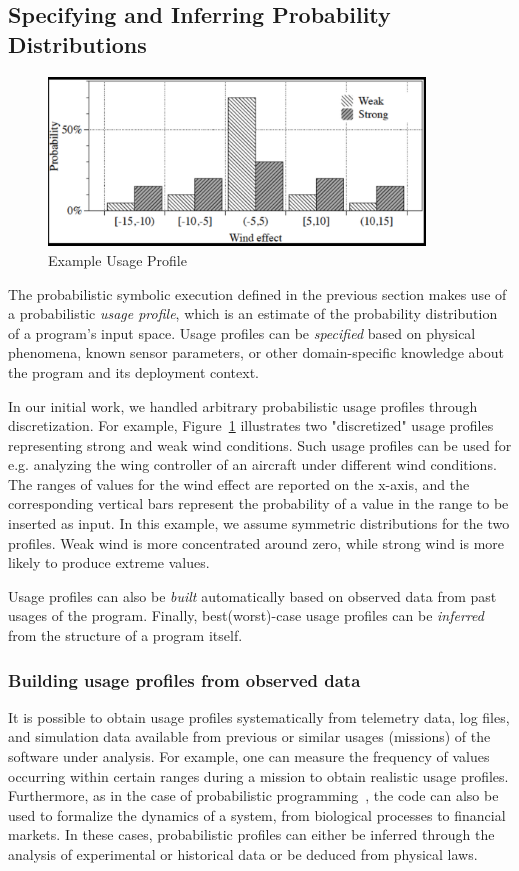 \subsection{Specifying and Inferring Probability Distributions}
\label{sec:probspecs}

\begin{figure}
\centering
      \includegraphics[width=10cm]{up}
\caption{Example Usage Profile}
\label{fig:up}
\end{figure}


The probabilistic symbolic execution defined in the previous section
makes use of a probabilistic {\em usage profile}, which is an estimate
of the probability distribution of a program's input space.  Usage
profiles can be {\em specified} based on physical phenomena, known
sensor parameters, or other domain-specific knowledge about the program
and its deployment context.  

In our initial work, we handled arbitrary probabilistic usage profiles through discretization. For example, Figure~\ref{fig:up} illustrates two "discretized" usage profiles representing strong and weak wind conditions. Such usage profiles can be used for e.g. analyzing the wing controller of an aircraft under different wind conditions. The ranges of values for the wind effect are reported on the x-axis, and the corresponding vertical bars represent the probability of a value in the range to be inserted as input. In this example, we assume symmetric distributions for the two profiles. Weak wind is more concentrated around zero, while strong wind is more likely to produce extreme values.


Usage profiles can also be {\em built}
automatically based on observed data from past usages of the program.
Finally, best(worst)-case usage profiles can be {\em inferred} from
the structure of a program itself.  

\subsubsection{Building usage profiles from observed data}
It is possible to obtain usage profiles systematically from
telemetry data, log files, and simulation
data available from previous or similar usages (missions) of 
the software under analysis.
For example, one can measure
the frequency of values occurring within certain ranges
during a mission to obtain realistic usage profiles. 
Furthermore, as in the case of probabilistic
programming~\cite{Gordon2014}, the code can also be
used to formalize the dynamics of a system, from biological processes
to financial markets. In these cases, probabilistic profiles can 
either be inferred through the analysis of experimental or historical
data or be deduced from physical laws.


